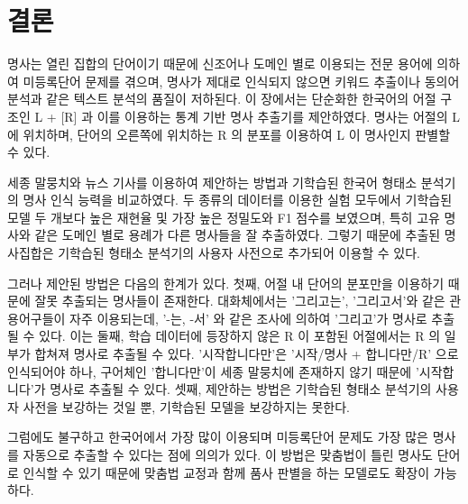 \documentclass[oneside, ko,phd]{snuthesis_utf8_kor}
\begin{document}
\section{결론}
명사는 열린 집합의 단어이기 때문에 신조어나 도메인 별로 이용되는 전문 용어에 의하여 미등록단어 문제를 겪으며, 명사가 제대로 인식되지 않으면 키워드 추출이나 동의어 분석과 같은 텍스트 분석의 품질이 저하된다.
이 장에서는 단순화한 한국어의 어절 구조인 L + [R] 과 이를 이용하는 통계 기반 명사 추출기를 제안하였다.
명사는 어절의 L 에 위치하며, 단어의 오른쪽에 위치하는 R 의 분포를 이용하여 L 이 명사인지 판별할 수 있다.

세종 말뭉치와 뉴스 기사를 이용하여 제안하는 방법과 기학습된 한국어 형태소 분석기의 명사 인식 능력을 비교하였다.
두 종류의 데이터를 이용한 실험 모두에서 기학습된 모델 두 개보다 높은 재현율 및 가장 높은 정밀도와 F1 점수를 보였으며, 특히 고유 명사와 같은 도메인 별로 용례가 다른 명사들을 잘 추출하였다. 그렇기 때문에 추출된 명사집합은 기학습된 형태소 분석기의 사용자 사전으로 추가되어 이용할 수 있다.

그러나 제안된 방법은 다음의 한계가 있다.
첫째, 어절 내 단어의 분포만을 이용하기 때문에 잘못 추출되는 명사들이 존재한다.
대화체에서는 '그리고는', '그리고서'와 같은 관용어구들이 자주 이용되는데, '-는, -서' 와 같은 조사에 의하여 '그리고'가 명사로 추출될 수 있다.
이는 
둘째, 학습 데이터에 등장하지 않은 R 이 포함된 어절에서는 R 의 일부가 합쳐져 명사로 추출될 수 있다.
'시작합니다만'은 '시작/명사 + 합니다만/R' 으로 인식되어야 하나, 구어체인 '합니다만'이 세종 말뭉치에 존재하지 않기 때문에 '시작합니다'가 명사로 추출될 수 있다.
셋째, 제안하는 방법은 기학습된 형태소 분석기의 사용자 사전을 보강하는 것일 뿐, 기학습된 모델을 보강하지는 못한다.

그럼에도 불구하고 한국어에서 가장 많이 이용되며 미등록단어 문제도 가장 많은 명사를 자동으로 추출할 수 있다는 점에 의의가 있다.
이 방법은 맞춤법이 틀린 명사도 단어로 인식할 수 있기 때문에 맞춤법 교정과 함께 품사 판별을 하는 모델로도 확장이 가능하다.
\end{document}
